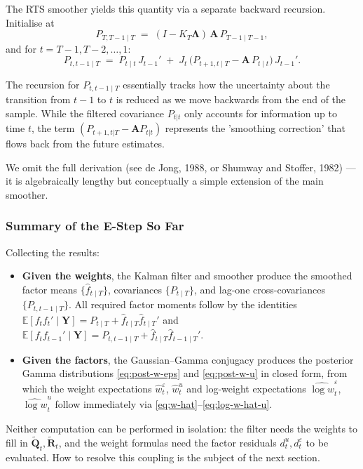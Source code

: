 \documentclass[11pt, a4paper, oneside]{article}
\newcommand{\mY}{\mathbf{Y}}
\newcommand{\mL}{\boldsymbol{\Lambda}}
\newcommand{\mA}{\mathbf{A}}
\newcommand{\mR}{\mathbf{R}}
\newcommand{\mQ}{\mathbf{Q}}
\begin{document}
The RTS smoother yields this quantity via a separate backward
recursion. Initialise at
\[
P_{T, T-1 \mid T} \;=\; (I - K_T \mL)\, \mA\, P_{T-1 \mid T-1},
\]
and for $t = T-1, T-2, \ldots, 1$:
\begin{equation}
P_{t, t-1 \mid T} \;=\; P_{t \mid t}\, J_{t-1}' \;+\; J_t\,\big(P_{t+1, t \mid T} - \mA\, P_{t \mid t}\big)\, J_{t-1}'.
\label{eq:smoother-lag-cov}
\end{equation}

The recursion for $P_{t, t-1 \mid T}$ essentially tracks how the uncertainty about the transition from $t-1$ to $t$ is reduced as we move backwards from the end of the sample. While the filtered covariance $P_{t|t}$ only accounts for information up to time $t$, the term $(P_{t+1, t|T} - \mathbf{A} P_{t|t})$ represents the 'smoothing correction' that flows back from the future estimates.

We omit the full derivation (see de Jong, 1988, or
Shumway and Stoffer, 1982) — it is algebraically lengthy but conceptually
a simple extension of the main smoother.

\subsubsection{Summary of the E-Step So Far}

Collecting the results:
\begin{itemize}[leftmargin=1.5em, itemsep=3pt]
    \item \textbf{Given the weights}, the Kalman filter and smoother
          produce the smoothed factor means $\{\hat{f}_{t \mid T}\}$,
          covariances $\{P_{t \mid T}\}$, and lag-one cross-covariances
          $\{P_{t, t-1 \mid T}\}$. All required factor moments follow
          by the identities
          $\mathbb{E}[f_t f_t' \mid \mY] = P_{t \mid T} + \hat{f}_{t \mid T}\hat{f}_{t \mid T}'$
          and
          $\mathbb{E}[f_t f_{t-1}' \mid \mY] = P_{t, t-1 \mid T} + \hat{f}_{t \mid T}\hat{f}_{t-1 \mid T}'$.
    \item \textbf{Given the factors}, the Gaussian–Gamma conjugacy
          produces the posterior Gamma distributions \eqref{eq:post-w-eps}
          and \eqref{eq:post-w-u} in closed form, from which the weight
          expectations $\hat{w}^\varepsilon_t$, $\hat{w}^u_t$ and
          log-weight expectations $\widehat{\log w}^\varepsilon_t$,
          $\widehat{\log w}^u_t$ follow immediately via
          \eqref{eq:w-hat}--\eqref{eq:log-w-hat-u}.
\end{itemize}
Neither computation can be performed in isolation: the filter needs
the weights to fill in $\tilde{\mQ}_t, \tilde{\mR}_t$, and the weight
formulas need the factor residuals $d^u_t, d^\varepsilon_t$ to be
evaluated. How to resolve this coupling is the subject of the next
section.
\end{document}
